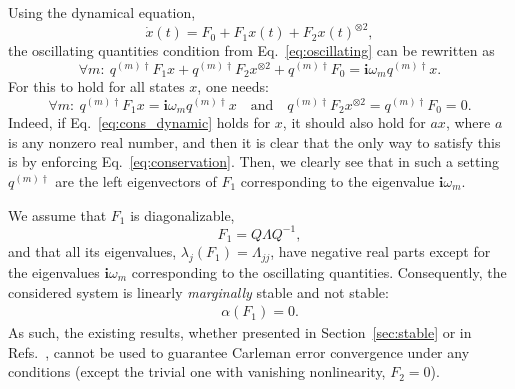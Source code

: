 \documentclass[superscriptaddress,onecolumn,nofootinbib,longbibliography,a4paper,accepted=2026-09-29]{quantumarticle}
\theoremstyle{plain}
\theoremstyle{definition}
\numberwithin{thm}{section}
\numberwithin{assumption}{section}
\numberwithin{lemma}{section}
\numberwithin{prop}{section}
\numberwithin{cor}{section}
\numberwithin{definition}{section}
\numberwithin{rmk}{section}
\numberwithin{equation}{section}
\newcommand{\ot}{\otimes}
\renewcommand{\i}{\ensuremath{\mathbf{i}}}
\begin{document}
Using the dynamical equation,
\begin{equation}
    \dot{x}(t) = F_0 + F_1 x(t) + F_2 x(t)^{\ot 2},
\end{equation}
the oscillating quantities condition from Eq.~\eqref{eq:oscillating} can be rewritten as
\begin{equation}
    \label{eq:cons_dynamic}
    \forall m:~q^{(m)\dagger} F_1 x+q^{(m)\dagger} F_2 x^{\otimes 2}+q^{(m)\dagger}F_0 = {\i \omega_m q^{(m)\dagger} x}.
\end{equation}
For this to hold for all states $x$, one needs: 
\begin{equation}
    \label{eq:conservation}
    \forall m:~ q^{(m)\dagger} F_1 x=\i \omega_m q^{(m)\dagger}x\quad \text{and}\quad 
    q^{(m)\dagger} F_2 x^{\otimes 2}=q^{(m)\dagger}F_0 = 0.
\end{equation}
Indeed, if Eq.~\eqref{eq:cons_dynamic} holds for $x$, it should also hold for $ax$, where $a$ is any nonzero real number, and then it is clear that the only way to satisfy this is by enforcing Eq.~\eqref{eq:conservation}. Then, we clearly see that in such a setting $q^{(m)\dagger}$ are the left eigenvectors of $F_1$ corresponding to the eigenvalue $\i \omega_m$. 

We assume that $F_1$ is diagonalizable,
\begin{equation}
    F_1 = Q\Lambda Q^{-1},
\end{equation}
and that all its eigenvalues, $\lambda_j(F_1)=\Lambda_{jj}$, have negative real parts except for the eigenvalues $\i \omega_m$ corresponding to the oscillating quantities. Consequently, the considered system is linearly \emph{marginally} stable and not stable:
\begin{align}
    \alpha(F_1)=0.
\end{align}
As such, the existing results, whether presented in Section~\ref{sec:stable} or in Refs.~\cite{forets2017explicit,liu2021efficient,krovi2023improved,costa2023further}, cannot be used to guarantee Carleman error convergence under any conditions (except the trivial one with vanishing nonlinearity, $F_2=0$).
\end{document}
